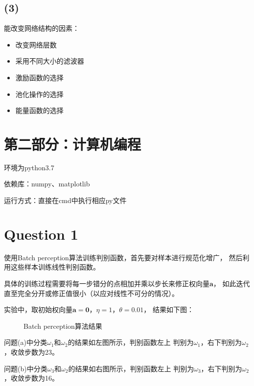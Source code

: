 \documentclass{article}
\newcommand{\question}[1]{\section*{Question #1}}
\renewcommand{\part}[1]{\subsection*{(#1)}}
\begin{document}
\part{3}
能改变网络结构的因素：
\begin{itemize}
	\item 改变网络层数
	\item 采用不同大小的滤波器
	\item 激励函数的选择
	\item 池化操作的选择
	\item 能量函数的选择
\end{itemize}

\section*{第二部分：计算机编程}
环境为python3.7

依赖库：numpy、matplotlib

运行方式：直接在cmd中执行相应py文件

\question{1}
使用Batch perception算法训练判别函数，首先要对样本进行规范化增广，
然后利用这些样本训练线性判别函数。

具体的训练过程需要将每一步错分的点相加并乘以步长来修正权向量$\pmb{a}$，
如此迭代直至完全分开或修正值很小（以应对线性不可分的情况）。

实验中，取初始权向量$\pmb{a} = \pmb{0}$，$\eta = 1$，$\theta = 0.01$，
结果如下图：
\begin{figure}[ht]
	\centering
	\centering
	\caption{Batch perception算法结果}
	\label{figl}
\end{figure}

问题(a)中分类$\omega_1$和$\omega_2$的结果如左图所示，判别函数左上
判别为$\omega_1$，右下判别为$\omega_2$，收敛步数为23。

问题(b)中分类$\omega_3$和$\omega_2$的结果如右图所示，判别函数左上
判别为$\omega_3$，右下判别为$\omega_2$，收敛步数为16。
\end{document}

